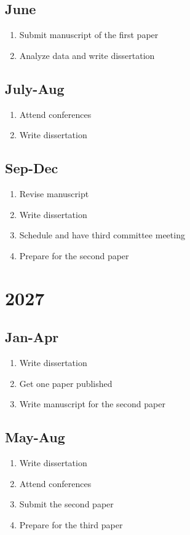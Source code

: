 \documentclass[12pt,letter]{article}
\begin{document}
\subsection{June}
\begin{enumerate}
	\item Submit manuscript of the first paper
	\item Analyze data and write dissertation
	\end{enumerate}	
\subsection{July-Aug}
\begin{enumerate}
	\item Attend conferences
	\item Write dissertation
	\end{enumerate}
\subsection{Sep-Dec}
\begin{enumerate}
	\item Revise manuscript
	\item Write dissertation
	\item Schedule and have third committee meeting
	\item Prepare for the second paper
	\end{enumerate}			
\section{2027}
\subsection{Jan-Apr}
\begin{enumerate}
	\item Write dissertation
	\item Get one paper published
	\item Write manuscript for the second paper
	\end{enumerate}	
\subsection{May-Aug}
\begin{enumerate}
	\item Write dissertation
	\item Attend conferences
	\item Submit the second paper
	\item Prepare for the third paper
	\end{enumerate}
\end{document}
